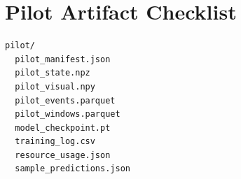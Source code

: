 \documentclass[11pt,a4paper]{article}
\begin{document}
\section{Pilot Artifact Checklist}
\begin{verbatim}
pilot/
  pilot_manifest.json
  pilot_state.npz
  pilot_visual.npy
  pilot_events.parquet
  pilot_windows.parquet
  model_checkpoint.pt
  training_log.csv
  resource_usage.json
  sample_predictions.json
\end{verbatim}
\end{document}

